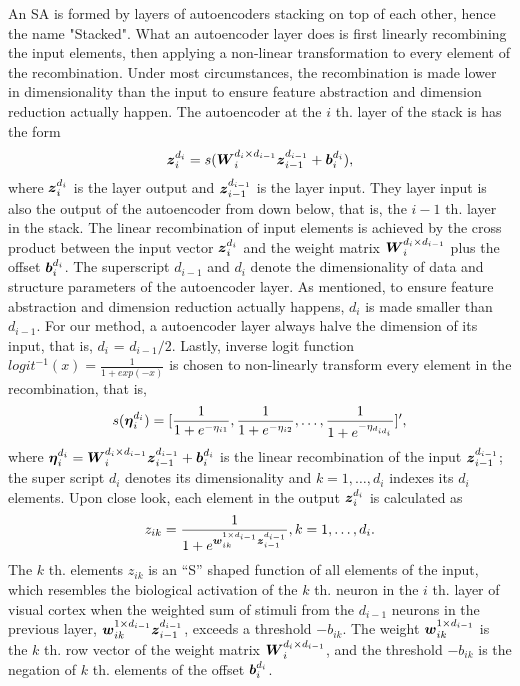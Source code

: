 An SA is formed by layers of autoencoders stacking on top of each other, hence the name "Stacked". What an autoencoder layer does is first linearly recombining the input elements, then applying a non-linear transformation to every element of the recombination. Under most circumstances, the recombination is made lower in dimensionality than the input to ensure feature abstraction and dimension reduction actually happen. The autoencoder at the $i$ th. layer of the stack is has the form
\begin{equation} \label{eq:AE}
  \boldsymbol{z}_i^{d_i} = s(\boldsymbol{W}_{i}^{d_{i} \times d_{i-1}} {\boldsymbol{z}_{i-1}^{d_{i-1}}} + \boldsymbol{b}_{i}^{d_{i}}),
\end{equation}
where ${\boldsymbol{z}_{i}^{d_{i}}}$ is the layer output and ${\boldsymbol{z}_{i-1}^{d_{i-1}}}$ is the layer input. They layer input is also the output of the autoencoder from down below, that is, the $i-1$ th. layer in the stack. The linear recombination of input elements is achieved by the cross product between the input vector ${\boldsymbol{z}_{i}^{d_{i}}}$ and the weight matrix $\boldsymbol{W}_{i}^{d_{i} \times d_{i-1}}$ plus the offset $\boldsymbol{b}_{i}^{d_{i}}$. The superscript $d_{i-1}$ and $d_i$ denote the dimensionality of data and structure parameters of the autoencoder layer. As mentioned, to ensure feature abstraction and dimension reduction actually happens, $d_i$ is made smaller than $d_{i-1}$. For our method, a autoencoder layer always halve the dimension of its input, that is, $d_i$ = $d_{i-1}/2$. Lastly, inverse logit function $logit^{-1}(x) = \frac{1}{1+exp(-x)}$ is chosen to non-linearly transform every element in the recombination, that is,
\begin{equation} \label{eq:InvLgt}
    s(\boldsymbol{\eta}_i^{d_i})     = [\frac{1}{1+e^{-\eta_{i1}}}, \frac{1}{1+e^{-\eta_{i2}}}, \dots, \frac{1}{1+e^{-\eta_{d_{id_i}}}}]^{\prime},
\end{equation}
where $\boldsymbol{\eta}_i^{d_i} = \boldsymbol{W}_{i}^{d_{i} \times d_{i-1}} {\boldsymbol{z}_{i-1}^{d_{i-1}}} + \boldsymbol{b}_{i}^{d_{i}}$ is the linear recombination of the input ${\boldsymbol{z}_{i-1}^{d_{i-1}}}$; the super script $d_i$ denotes its dimensionality and $k = 1, \dots, d_i$ indexes its $d_i$ elements. Upon close look, each element in the output ${\boldsymbol{z}_{i}^{d_{i}}}$ is calculated as
\[ z_{ik} = \frac{1}{1 + e^{{\boldsymbol{w}_{ik}^{1 \times d_{i-1}}} {\boldsymbol{z}_{i-1}^{d_{i-1}}}}}, k = 1, \dots, d_i .\]
The $k$ th. elements $z_{ik}$ is an ``S'' shaped function of all elements of the input, which resembles the biological activation of the $k$ th. neuron in the $i$ th. layer of visual cortex when the weighted sum of stimuli from the $d_{i-1}$ neurons in the previous layer, ${\boldsymbol{w}_{ik}^{1 \times d_{i-1}}} {\boldsymbol{z}_{i-1}^{d_{i-1}}}$, exceeds a threshold $-b_{ik}$. The weight ${\boldsymbol{w}_{ik}^{1 \times d_{i-1}}}$ is the $k$ th. row vector of the weight matrix $\boldsymbol{W}_{i}^{d_{i} \times d_{i-1}}$, and the threshold $-b_{ik}$ is the negation of $k$ th. elements of the offset $\boldsymbol{b}_{i}^{d_{i}}$.

